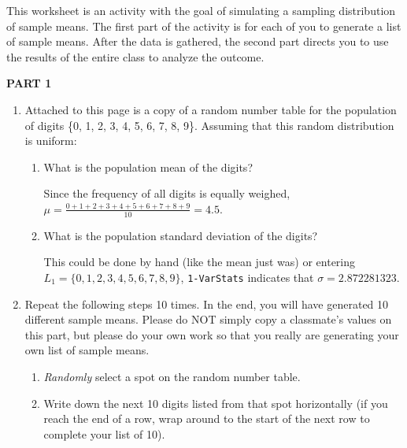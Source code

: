 \documentclass{article}
\newcommand{\answer}[1]{\color{red}#1}
\begin{document}
\pagestyle{myheadings}

\begin{center}
\textbf{}
\end{center}

This worksheet is an activity with the goal of simulating a sampling distribution of sample means. The first part of the activity is for each of you to generate a list of sample means. After the data is gathered, the second part directs you to use the results of the entire class to analyze the outcome.

\textbf{PART 1}

\begin{enumerate}

\item Attached to this page is a copy of a random number table for the population of digits \{0, 1, 2, 3, 4, 5, 6, 7, 8, 9\}. Assuming that this random distribution is uniform:

	\begin{enumerate}
	
	\item What is the population mean of the digits? 
	
	{\answer Since the frequency of all digits is equally weighed, $\mu = \frac{0+1+2+3+4+5+6+7+8+9}{10} = 4.5$.
	}
	
	\item What is the population standard deviation of the digits? 
	
	{\answer This could be done by hand (like the mean just was) or entering $L_1=\{0, 1, 2, 3, 4, 5, 6, 7, 8, 9\}$, \texttt{1-VarStats} indicates that $\sigma = 2.872281323$.
	} 
	\end{enumerate}
	
\item Repeat the following steps 10 times. In the end, you will have generated 10 different sample means. Please do NOT simply copy a classmate's values on this part, but please do your own work so that you really are generating your own list of sample means. 

	\begin{enumerate}
	
	\item {\em Randomly} select a spot on the random number table.
	
	\item Write down the next 10 digits listed from that spot horizontally (if you reach the end of a row, wrap around to the start of the next row to complete your list of 10). 
	

\end{enumerate}
\end{enumerate}
\end{document}
